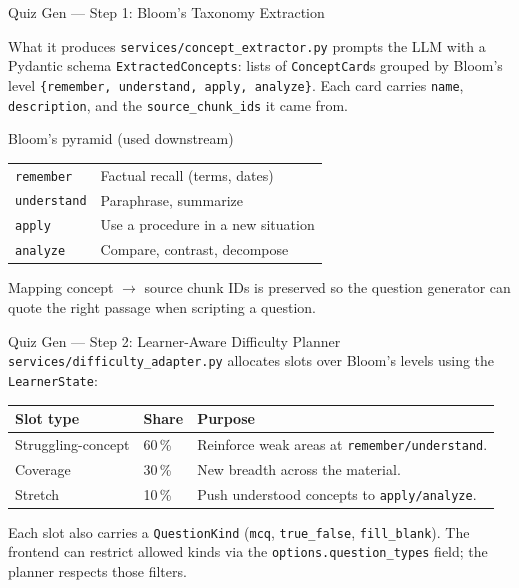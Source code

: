 \documentclass[aspectratio=169, 10pt]{beamer}
\begin{document}
\begin{frame}{Quiz Gen --- Step 1: Bloom's Taxonomy Extraction}
  \begin{block}{What it produces}
    \scriptsize
    \texttt{services/concept\_extractor.py} prompts the LLM with a
    Pydantic schema \texttt{ExtractedConcepts}: lists of
    \texttt{ConceptCard}s grouped by Bloom's level
    \texttt{\{remember, understand, apply, analyze\}}. Each card carries
    \texttt{name}, \texttt{description}, and the
    \texttt{source\_chunk\_ids} it came from.
  \end{block}

  \begin{exampleblock}{Bloom's pyramid (used downstream)}
    \scriptsize
    \begin{tabular}{l p{7cm}}
      \texttt{remember}   & Factual recall (terms, dates) \\
      \texttt{understand} & Paraphrase, summarize \\
      \texttt{apply}      & Use a procedure in a new situation \\
      \texttt{analyze}    & Compare, contrast, decompose \\
    \end{tabular}
  \end{exampleblock}

  \scriptsize
  Mapping concept $\to$ source chunk IDs is preserved so the
  question generator can quote the right passage when scripting a
  question.
\end{frame}

\begin{frame}{Quiz Gen --- Step 2: Learner-Aware Difficulty Planner}
  \scriptsize
  \texttt{services/difficulty\_adapter.py} allocates slots over
  Bloom's levels using the \texttt{LearnerState}:

  \begin{tcolorbox}[colback=eduLightOrange, colframe=eduOrange, title=Slot allocation]
    \scriptsize
    \begin{tabular}{p{2.8cm} p{2.2cm} p{6cm}}
      \toprule
      \textbf{Slot type} & \textbf{Share} & \textbf{Purpose} \\
      \midrule
      Struggling-concept & 60\,\%        & Reinforce weak areas at \texttt{remember/understand}. \\
      Coverage           & 30\,\%        & New breadth across the material. \\
      Stretch            & 10\,\%        & Push understood concepts to \texttt{apply/analyze}. \\
      \bottomrule
    \end{tabular}
  \end{tcolorbox}

  Each slot also carries a \texttt{QuestionKind} (\texttt{mcq},
  \texttt{true\_false}, \texttt{fill\_blank}). The frontend can
  restrict allowed kinds via the \texttt{options.question\_types} field;
  the planner respects those filters.
\end{frame}
\end{document}
